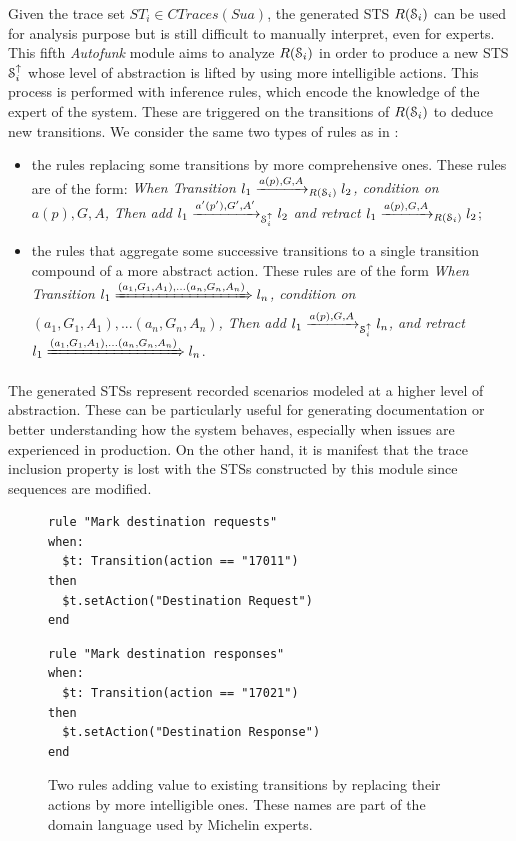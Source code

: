 Given the trace set $ST_i \in CTraces(Sua)$, the generated STS
$R(\EuScript{S}_i)$ can be used for analysis purpose but is still
difficult to manually interpret, even for experts.  This fifth
\textit{Autofunk} module aims to analyze $R(\EuScript{S}_i)$ in order to
produce a new STS $\EuScript{S}_i^\uparrow$ whose level of
abstraction is lifted by using more intelligible actions. This
process is performed with inference rules, which encode the
knowledge of the expert of the system. These are triggered on the
transitions of $R(\EuScript{S}_i)$ to deduce new transitions. We
consider the same two types of rules as in
:

\begin{itemize}
    \item the rules replacing some transitions by more
    comprehensive ones. These rules are of the form: \textit{When
    Transition $l_1 \xrightarrow{a(p),G,A}_{R(\EuScript{S}_i)}
    l_2$, condition on $a(p),G,A$, Then add $l_1
    \xrightarrow{a'(p'),G',A'}_{\EuScript{S}_i^\uparrow} l_2$ and
    retract $l_1 \xrightarrow{a(p),G,A}_{R(\EuScript{S}_i)}
l_2$};

    \item the rules that aggregate some successive transitions
    to a single transition compound of a more abstract action.
    These rules are of the form \textit{When Transition $l_1
    \xRightarrow{(a_1,G_1,A_1),...(a_n,G_n,A_n)} l_n$, condition
    on $(a_1,G_1,A_1),...(a_n,G_n,A_n)$, Then add $l_1
    \xrightarrow{a(p),G,A}_{\EuScript{S}_i^\uparrow} l_n $, and
    retract $l_1 \xRightarrow{(a_1,G_1,A_1),...(a_n,G_n,A_n)} l_n$}.
\end{itemize}

The generated STSs represent recorded scenarios modeled at a
higher level of abstraction. These can be particularly useful for
generating documentation or better understanding how the system
behaves, especially when issues are experienced in production.
On the other hand, it is manifest that the trace inclusion
property is lost with the STSs constructed by this module since
sequences are modified.

\begin{figure}[ht]
\begin{framed}
\begin{BVerbatim}
rule "Mark destination requests"
when:
  $t: Transition(action == "17011")
then
  $t.setAction("Destination Request")
end
\end{BVerbatim}
\end{framed}

\begin{framed}
\begin{BVerbatim}
rule "Mark destination responses"
when:
  $t: Transition(action == "17021")
then
  $t.setAction("Destination Response")
end
\end{BVerbatim}
\end{framed}

  \caption{Two rules adding value to existing transitions by
  replacing their actions by more intelligible ones. These names
  are part of the domain language used by Michelin experts.}
  \label{rule:rename-tr}
\end{figure}

